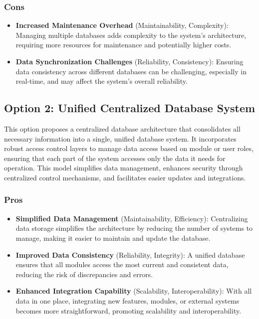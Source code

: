 \subsubsection*{Cons}
\begin{itemize}[noitemsep]
    \item \textbf{Increased Maintenance Overhead} (Maintainability, Complexity): Managing multiple databases adds complexity to the system's architecture, requiring more resources for maintenance and potentially higher costs.
    \item \textbf{Data Synchronization Challenges} (Reliability, Consistency): Ensuring data consistency across different databases can be challenging, especially in real-time, and may affect the system's overall reliability.
\end{itemize}

\subsection*{Option 2: Unified Centralized Database System}

This option proposes a centralized database architecture that consolidates all necessary information into a single, unified database system. It incorporates robust access control layers to manage data access based on module or user roles, ensuring that each part of the system accesses only the data it needs for operation. This model simplifies data management, enhances security through centralized control mechanisms, and facilitates easier updates and integrations.

\subsubsection*{Pros}
\begin{itemize}[noitemsep]
    \item \textbf{Simplified Data Management} (Maintainability, Efficiency): Centralizing data storage simplifies the architecture by reducing the number of systems to manage, making it easier to maintain and update the database.
    \item \textbf{Improved Data Consistency} (Reliability, Integrity): A unified database ensures that all modules access the most current and consistent data, reducing the risk of discrepancies and errors.
    \item \textbf{Enhanced Integration Capability} (Scalability, Interoperability): With all data in one place, integrating new features, modules, or external systems becomes more straightforward, promoting scalability and interoperability.
\end{itemize}

